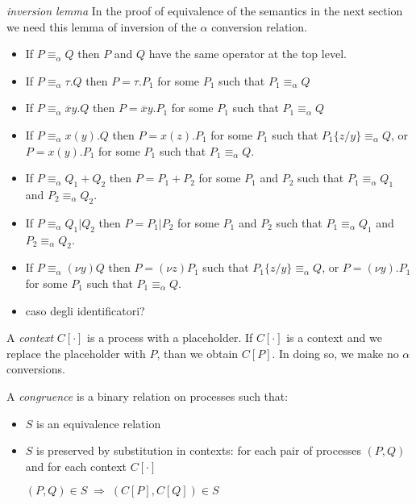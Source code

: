 \begin{lemma}{\emph{inversion lemma}}
  In the proof of equivalence of the semantics in the next section we need this lemma of inversion of the $\alpha$ conversion relation.
  \begin{itemize}
    \item 
      If $P\equiv_{\alpha} Q$ then $P$ and $Q$ have the same operator at the top level. 
    \item
      If $P\equiv_{\alpha} \tau.Q$ then $P=\tau.P_{1}$ for some $P_{1}$ such that $P_{1}\equiv_{\alpha}Q$
    \item
      If $P\equiv_{\alpha} \overline{x}y.Q$ then $P=\overline{x}y.P_{1}$ for some $P_{1}$ such that $P_{1}\equiv_{\alpha}Q$
    \item
      If $P\equiv_{\alpha} x(y).Q$ then $P=x(z).P_{1}$ for some $P_{1}$ such that $P_{1}\{z/y\}\equiv_{\alpha}Q$, or $P=x(y).P_{1}$ for some $P_{1}$ such that $P_{1}\equiv_{\alpha}Q$.
    \item
      If $P\equiv_{\alpha} Q_{1}+Q_{2}$ then $P=P_{1}+P_{2}$ for some $P_{1}$ and $P_{2}$ such that $P_{1}\equiv_{\alpha}Q_{1}$ and $P_{2}\equiv_{\alpha}Q_{2}$.
    \item 
      If $P\equiv_{\alpha} Q_{1}|Q_{2}$ then $P=P_{1}|P_{2}$ for some $P_{1}$ and $P_{2}$ such that $P_{1}\equiv_{\alpha}Q_{1}$ and $P_{2}\equiv_{\alpha}Q_{2}$.
    \item 
      If $P\equiv_{\alpha} (\nu y)Q$ then $P=(\nu z)P_{1}$ such that $P_{1}\{z/y\}\equiv_{\alpha}Q$, or $P=(\nu y).P_{1}$ for some $P_{1}$ such that $P_{1}\equiv_{\alpha}Q$.
    \item 
      caso degli identificatori?
  \end{itemize}

\end{lemma}



\begin{definition}
  A \emph{context} $C[\cdot]$ is a process with a placeholder. If $C[\cdot]$ is a context and we replace the placeholder with $P$, than we obtain $C[P]$. In doing so, we make no $\alpha$ conversions.
\end{definition}


\begin{definition}
  A \emph{congruence} is a binary relation on processes such that:
  \begin{itemize}
    \item 
      $S$ is an equivalence relation
    \item 
      $S$ is preserved by substitution in contexts: for each pair of processes $(P, Q)$ and for each context $C[\cdot]$
      \begin{center}
	$(P,Q)\in S\; \Rightarrow\; (C[P], C[Q])\in S$
      \end{center}
  \end{itemize}
\end{definition}

